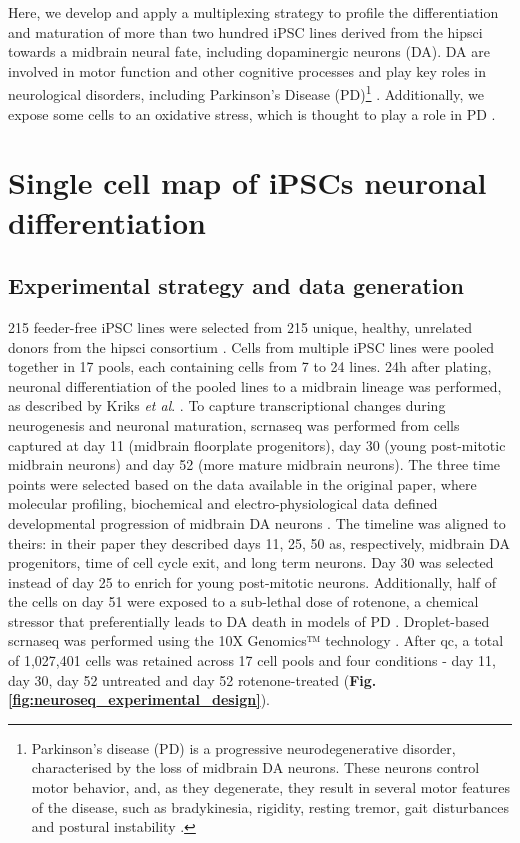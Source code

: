 Here, we develop and apply a multiplexing strategy to profile the differentiation and maturation of more than two hundred iPSC lines derived from the \gls{hipsci} towards a midbrain neural fate, including dopaminergic neurons (DA). 
DA are involved in motor function and other cognitive processes and play key roles in neurological disorders, including Parkinson’s Disease (PD)\footnote{Parkinson’s disease (PD) is a progressive neurodegenerative disorder, characterised by the loss of midbrain DA neurons. 
These neurons control motor behavior, and, as they degenerate, they result in several motor features of the disease, such as bradykinesia, rigidity, resting tremor, gait disturbances and postural instability \cite{lees2009parkinsons}.} \cite{osborn2017seq, stoddard2020stem}. 
Additionally, we expose some cells to an oxidative stress, which is thought to play a role in PD \cite{xiong2012mitochondrial}.

\newpage

\section{Single cell map of iPSCs neuronal differentiation}
\label{sec:neuroseq_overview}

\subsection{Experimental strategy and data generation}

215 feeder-free iPSC lines were selected from 215 unique, healthy, unrelated donors from the \gls{hipsci} consortium \cite{kilpinen2017common}.
Cells from multiple iPSC lines were pooled together in 17 pools, each containing cells from 7 to 24 lines.
24h after plating, neuronal differentiation of the pooled lines to a midbrain lineage was performed, as described by Kriks \textit{et al}. \cite{kriks2011dopamine}. 
To capture transcriptional changes during neurogenesis and neuronal maturation, \gls{scrnaseq} was performed from cells captured at day 11 (midbrain floorplate progenitors), day 30 (young post-mitotic midbrain neurons) and day 52 (more mature midbrain neurons). 
The three time points were selected based on the data available in the original paper, where molecular profiling, biochemical and electro-physiological data defined developmental progression of midbrain DA neurons \cite{kriks2011dopamine}. 
The timeline was aligned to theirs: in their paper they described days 11, 25, 50 as, respectively, midbrain DA progenitors, time of cell cycle exit, and long term neurons.
Day 30 was selected instead of day 25 to enrich for young post-mitotic neurons. 
Additionally, half of the cells on day 51 were exposed to a sub-lethal dose of rotenone, a chemical stressor that preferentially leads to DA death in models of PD \cite{xiong2012mitochondrial}.
Droplet-based \gls{scrnaseq} was performed using the 10X Genomics™ technology \cite{zheng2017massively}.
After \gls{qc}, a total of 1,027,401 cells was retained across 17 cell pools and four conditions - day 11, day 30, day 52 untreated and day 52 rotenone-treated (\textbf{Fig. \ref{fig:neuroseq_experimental_design}}).

